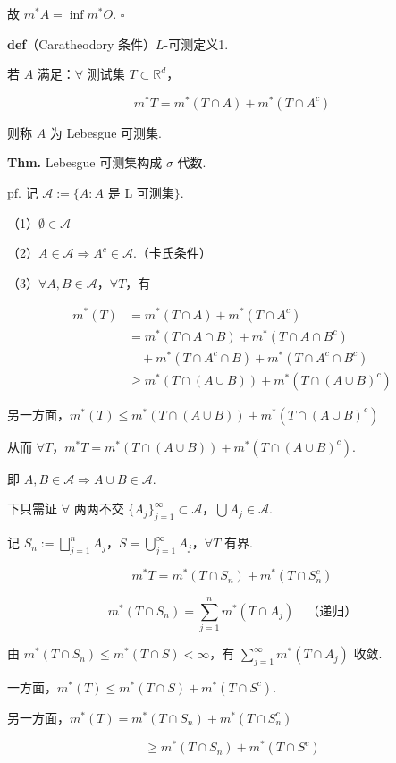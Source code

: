 \documentclass[11pt]{ctexart}
\theoremstyle{definition}
\begin{document}
故 $m^*A = \inf m^*O$. $\square$

\textbf{def}（Caratheodory 条件）$L$-可测定义1.

若 $A$ 满足：$\forall$ 测试集 $T \subset \mathbb{R}^d$，

\[
m^*T = m^*(T \cap A) + m^*(T \cap A^c)
\]

则称 $A$ 为 Lebesgue 可测集.

\textbf{Thm.} Lebesgue 可测集构成 $\sigma$ 代数.

pf. 记 $\mathscr{A} := \{A : A$ 是 L 可测集$\}$.

（1）$\emptyset \in \mathscr{A}$

（2）$A \in \mathscr{A} \Rightarrow A^c \in \mathscr{A}$.（卡氏条件）

（3）$\forall A, B \in \mathscr{A}$，$\forall T$，有

\[
\begin{aligned}
m^*(T) &= m^*(T \cap A) + m^*(T \cap A^c) \\
&= m^*(T \cap A \cap B) + m^*(T \cap A \cap B^c) \\
&\quad + m^*(T \cap A^c \cap B) + m^*(T \cap A^c \cap B^c) \\
&\geq m^*(T \cap (A \cup B)) + m^*(T \cap (A \cup B)^c)
\end{aligned}
\]

另一方面，$m^*(T) \leq m^*(T \cap (A \cup B)) + m^*(T \cap (A \cup B)^c)$

从而 $\forall T$，$m^*T = m^*(T \cap (A \cup B)) + m^*(T \cap (A \cup B)^c)$.

即 $A, B \in \mathscr{A} \Rightarrow A \cup B \in \mathscr{A}$.

下只需证 $\forall$ 两两不交 $\{A_j\}_{j=1}^{\infty} \subset \mathscr{A}$，$\bigcup A_j \in \mathscr{A}$.

记 $S_n := \bigsqcup_{j=1}^{n} A_j$，$S = \bigcup_{j=1}^{\infty} A_j$，$\forall T$ 有界.

\[
m^*T = m^*(T \cap S_n) + m^*(T \cap S_n^c)
\]

\[
m^*(T \cap S_n) = \sum_{j=1}^{n} m^*(T \cap A_j) \quad \text{（递归）}
\]

由 $m^*(T \cap S_n) \leq m^*(T \cap S) < \infty$，有 $\sum_{j=1}^{\infty} m^*(T \cap A_j)$ 收敛.

一方面，$m^*(T) \leq m^*(T \cap S) + m^*(T \cap S^c)$.

另一方面，$m^*(T) = m^*(T \cap S_n) + m^*(T \cap S_n^c)$

\[
\geq m^*(T \cap S_n) + m^*(T \cap S^c)
\]
\end{document}
